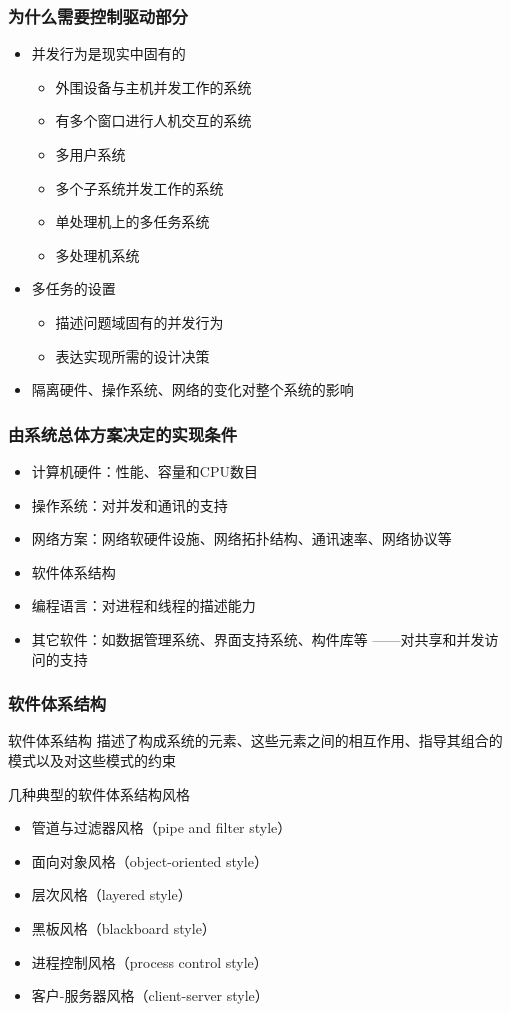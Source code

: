 \documentclass[compress]{beamer}
\begin{document}
\begin{frame}
  \frametitle{为什么需要控制驱动部分}
  \begin{itemize}
    \item 并发行为是现实中固有的
      \begin{itemize}
        \item 外围设备与主机并发工作的系统
        \item 有多个窗口进行人机交互的系统
        \item 多用户系统
        \item 多个子系统并发工作的系统
        \item 单处理机上的多任务系统
        \item 多处理机系统
      \end{itemize}

    \item 多任务的设置
      \begin{itemize}
        \item 描述问题域固有的并发行为
        \item 表达实现所需的设计决策
      \end{itemize}

    \item 隔离硬件、操作系统、网络的变化对整个系统的影响
  \end{itemize}
\end{frame}


\begin{frame}
  \frametitle{由系统总体方案决定的实现条件}
  \begin{itemize}
    \item 计算机硬件：性能、容量和CPU数目
    \item 操作系统：对并发和通讯的支持
    \item 网络方案：网络软硬件设施、网络拓扑结构、通讯速率、网络协议等
    \item 软件体系结构
    \item 编程语言：对进程和线程的描述能力
    \item 其它软件：如数据管理系统、界面支持系统、构件库等
  ——对共享和并发访问的支持
  \end{itemize}
\end{frame}

\begin{frame}
  \frametitle{软件体系结构}
  \begin{block}{软件体系结构}
    描述了构成系统的元素、这些元素之间的相互作用、指导其组合的
  模式以及对这些模式的约束
\end{block}
几种典型的软件体系结构风格
\begin{itemize}
  \item 管道与过滤器风格（pipe and filter style）
  \item 面向对象风格（object-oriented style）
  \item 层次风格（layered style）
  \item 黑板风格（blackboard style）
  \item 进程控制风格（process control style）
  \item 客户-服务器风格（client-server style） 
\end{itemize}

\end{frame}
\end{document}
